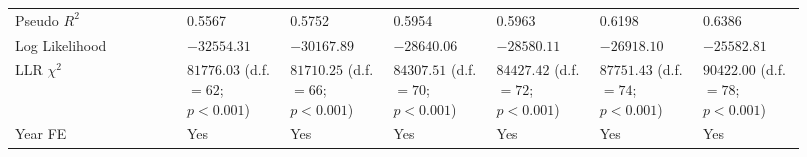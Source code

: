 {\begin{longtable}{p{0.2\linewidth}p{0.12\linewidth}p{0.12\linewidth}p{0.12\linewidth}p{0.12\linewidth}p{0.12\linewidth}p{0.12\linewidth}}
Pseudo $R^2$ & 0.5567 & 0.5752 & 0.5954 & 0.5963 & 0.6198 & 0.6386 \\ 
Log Likelihood & $-32554.31$ & $-30167.89$ & $-28640.06$ & $-28580.11$ & $-26918.10$ & $-25582.81$ \\ 
LLR $\chi^2$  & $81776.03$ (d.f. $= 62$; ${p < 0.001}$) & $81710.25$ (d.f. $= 66$; ${p < 0.001}$) & $84307.51$ (d.f. $= 70$; ${p < 0.001}$) & $84427.42$ (d.f. $= 72$; ${p < 0.001}$) & $87751.43$ (d.f. $= 74$; ${p < 0.001}$) & $90422.00$ (d.f. $= 78$; ${p < 0.001}$) \\ 
Year FE  & Yes & Yes & Yes & Yes & Yes & Yes \\ 
\hline 
\end{longtable} } 
